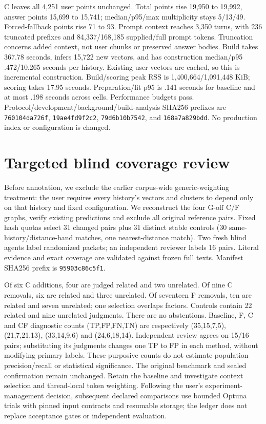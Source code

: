\documentclass[11pt]{article}
\begin{document}
C leaves all 4,251 user points unchanged. Total points rise 19,950 to 19,992,
answer points 15,699 to 15,741; median/p95/max multiplicity stays 5/13/49.
Forced-fallback points rise 71 to 93. Prompt context reaches 3,350 turns, with
236 truncated prefixes and 84,337/168,185 supplied/full prompt tokens.
Truncation concerns added context, not user chunks or preserved answer bodies.
Build takes 367.78 seconds, infers 15,722 new vectors, and has construction
median/p95 .472/10.265 seconds per history. Existing user vectors are cached,
so this is incremental construction. Build/scoring peak RSS is
1,400,664/1,091,448 KiB; scoring takes 17.95 seconds. Preparation/fit p95 is
.141 seconds for baseline and at most .198 seconds across cells. Performance
budgets pass. Protocol/development/background/build-analysis SHA256 prefixes
are \texttt{760104da726f}, \texttt{19ae4fd9f2c2}, \texttt{79d6b10b7542},
and \texttt{168a7a829bdd}. No production index or configuration is changed.

\section{Targeted blind coverage review}
Before annotation, we exclude the earlier corpus-wide generic-weighting
treatment: the user requires every history's vectors and clusters to depend
only on that history and fixed configuration. We reconstruct the four G-off
C/F graphs, verify existing predictions and exclude all original reference
pairs. Fixed hash quotas select 31 changed pairs plus 31 distinct stable
controls (30 same-history/distance-band matches, one nearest-distance match).
Two fresh blind agents label randomized packets; an independent reviewer labels
16 pairs. Literal evidence and exact coverage are validated against frozen
full texts. Manifest SHA256 prefix is \texttt{95903c86c5f1}.

Of six C additions, four are judged related and two unrelated. Of nine C
removals, six are related and three unrelated. Of seventeen F removals, ten
are related and seven unrelated; one selection overlaps factors. Controls
contain 22 related and nine unrelated judgments. There are no abstentions.
Baseline, F, C and CF diagnostic counts (TP,FP,FN,TN) are respectively
(35,15,7,5), (21,7,21,13), (33,14,9,6) and (24,6,18,14).
Independent review agrees on 15/16 pairs; substituting its judgments changes
one TP to FP in each method, without modifying primary labels. These purposive
counts do not estimate population precision/recall or statistical significance.
The original benchmark and sealed confirmation remain unchanged. Retain the
baseline and investigate context selection and thread-local token weighting.
Following the user's experiment-management decision, subsequent declared
comparisons use bounded Optuna trials with pinned input contracts and resumable
storage; the ledger does not replace acceptance gates or independent evaluation.
\end{document}

